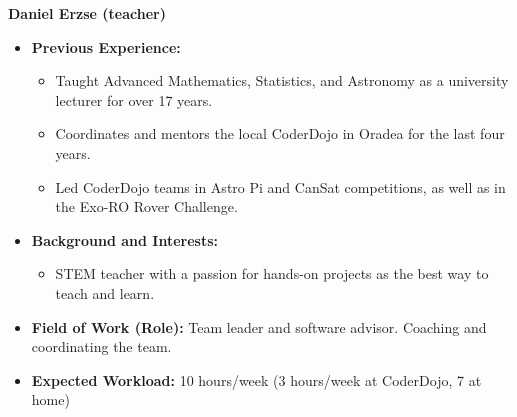     \item[] \textbf{Daniel Erzse (teacher)}
    \begin{itemize}[label=]
        \item[\faCogs] \textbf{Previous Experience:} 
        \begin{itemize}[label=]
            \item Taught Advanced Mathematics, Statistics, and Astronomy as a university lecturer for over 17 years.
            \item Coordinates and mentors the local CoderDojo in Oradea for the last four years.
            \item Led CoderDojo teams in Astro Pi and CanSat competitions, as well as in the Exo-RO Rover Challenge.
        \end{itemize}
        \item[\faGraduationCap] \textbf{Background and Interests:} 
        \begin{itemize}[label=]
            \item STEM teacher with a passion for hands-on projects as the best way to teach and learn.
        \end{itemize}
        \item[\faMicroscope] \textbf{Field of Work (Role):} Team leader and software advisor. Coaching and coordinating the team.
        \item[\faLaptopCode] \textbf{Expected Workload:} 10 hours/week (3 hours/week at CoderDojo, 7 at home)
    \end{itemize}
    \vspace{0.2 cm}
